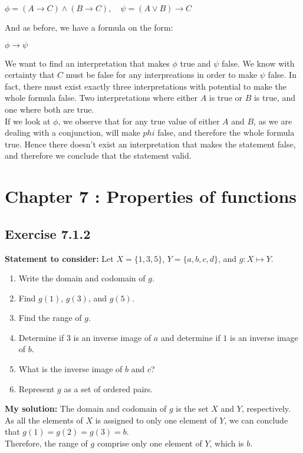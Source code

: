 \documentclass{article}
\newcommand{\cent}[1]{\begin{center}#1\end{center}}
\newcommand{\Remark}{\textbf{Statement to consider: }}
\newcommand{\Solution}{\textbf{My solution: }}
\newcommand{\Chapter}[2]{\section*{Chapter #1 : #2}}
\newcommand{\Exercise}[1]{\subsection*{Exercise #1}}
\begin{document}
\begin{enumerate}
 		\cent{$\phi = (A \to C) \wedge (B \to C), \quad \psi = (A \vee B) \to C $}
 		
 		And as before, we have a formula on the form:
 		
 		\cent{$\phi \to \psi$}
 		
 		We want to find an interpretation that makes $\phi$ true and $\psi$ false. We know with certainty that $C$ must be false for any interpreations in order to make $\psi$ false. In fact, there must exist exactly three interpretations with potential to make the whole formula false. Two interpretations where either $A$ is true or $B$ is true, and one where both are true.\\
 		
 		If we look at $\phi$, we observe that for any true value of either $A$ and $B$, as we are dealing with a conjunction, will make $phi$ false, and therefore the whole formula true. Hence there doesn't exist an interpretation that makes the statement false, and therefore we conclude that the statement valid.
 	\end{enumerate}
 \Chapter{7}{Properties of functions}
 	\Exercise{7.1.2}
 	
 	\Remark 
 	Let $X = \{1,3,5\}$, $Y = \{a,b,c,d\}$, and $g : X \mapsto Y$.
 	
 	\begin{enumerate}[label=\textbf{\alph*.}]
 		\item Write the domain and codomain of $g$.
 		\item Find $g(1)$, $g(3)$, and $g(5)$.
 		\item Find the range of $g$.
 		\item Determine if 3 is an inverse image of $a$ and determine if $1$ is an inverse image of $b$.
 		\item What is the inverse image of $b$ and $c$?
 		\item Represent $g$ as a set of ordered pairs.
 	\end{enumerate}
 
 	\Solution
 	The domain and codomain of $g$ is the set $X$ and $Y$, respectively.\\
 	
 	As all the elements of $X$ is assigned to only one element of $Y$, we can conclude that $g(1) = g(2) = g(3) = b$.\\
 	
 	Therefore, the range of $g$ comprise only one element of $Y$, which is $b$.\\
 	
\end{document}

